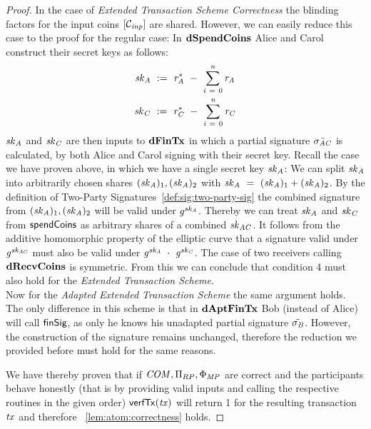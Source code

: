 \begin{proof}
    In the case of \emph{Extended Transaction Scheme Correctness} the blinding factors for the input coins $[\mathcal{C}_{\mathit{inp}}]$ are shared.
    However, we can easily reduce this case to the proof for the regular case:
    In $\mathbf{dSpendCoins}$ Alice and Carol construct their secret keys as follows:
    \begin{gather}
        \mathit{sk}_{\mathit{A}} ~:=~ \mathit{r}_{\mathit{A}}^* ~-~ \sum_{\mathit{i} ~=~ 0}^{\mathit{n}} \mathit{r}_{\mathit{A}} \\
        \mathit{sk}_{\mathit{C}} ~:=~ \mathit{r}_{\mathit{C}}^* ~-~ \sum_{\mathit{i} ~=~ 0}^{\mathit{n}} \mathit{r}_{\mathit{C}}
    \end{gather}
    $\mathit{sk}_{\mathit{A}}$ and $\mathit{sk}_{\mathit{C}}$ are then inputs to $\mathbf{dFinTx}$ in which a partial signature $\tilde{\sigma_{\mathit{A}\mathit{C}}}$ is calculated, by both Alice and Carol signing with their secret key.
    Recall the case we have proven above, in which we have a single secret key $\mathit{sk}_{\mathit{A}}$:
    We can split $\mathit{sk}_{\mathit{A}}$ into arbitrarily chosen shares $(\mathit{sk}_{\mathit{A}})_1, (\mathit{sk}_{\mathit{A}})_2$ with $\mathit{sk}_{\mathit{A}} ~=~ (\mathit{sk}_{\mathit{A}})_1 + (\mathit{sk}_{\mathit{A}})_2$.
    By the definition of Two-Party Signatures~\cref{def:sig:two-party-sig} the combined signature from $(\mathit{sk}_{\mathit{A}})_1, (\mathit{sk}_{\mathit{A}})_2$ will be valid under $\mathit{g}^{\mathit{sk}_{\mathit{A}}}$.
    Thereby we can treat $\mathit{sk}_{\mathit{A}}$ and $\mathit{sk}_{\mathit{C}}$ from $\mathsf{spendCoins}$ as arbitrary shares of a combined $\mathit{sk}_{\mathit{A}\mathit{C}}$.
    It follows from the additive homomorphic property of the elliptic curve that a signature valid under $\mathit{g}^{\mathit{sk}_{\mathit{A}\mathit{C}}}$ must also be valid under $\mathit{g}^{\mathit{sk}_{\mathit{A}}} ~\cdot~ \mathit{g}^{\mathit{sk}_{\mathit{C}}}$.
    The case of two receivers calling $\mathbf{dRecvCoins}$ is symmetric.
    From this we can conclude that condition 4 must also hold for the \emph{Extended Transaction Scheme}. \\
    Now for the \emph{Adapted Extended Transaction Scheme} the same argument holds.
    The only difference in this scheme is that in $\mathbf{dAptFinTx}$ Bob (instead of Alice) will call $\mathsf{finSig}$, as only he knows his unadapted partial signature $\tilde{\sigma_{\mathit{B}}}$.
    However, the construction of the signature remains unchanged, therefore the reduction we provided before must hold for the same reasons.

    We have thereby proven that if $\mathit{COM}, \Pi_{RP}, \Phi_{\mathit{MP}}$ are correct and the participants behave honestly (that is by providing valid inputs and calling the respective routines in the given order) $\mathsf{verfTx}(\mathit{tx})$ will return 1 for the resulting transaction $\mathit{tx}$ and therefore ~\cref{lem:atom:correctness} holds.
\end{proof}

